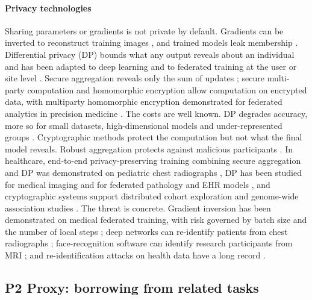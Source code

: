 \documentclass[acmsmall,screen,review]{acmart}
\theoremstyle{acmdefinition}
\begin{document}
\paragraph{Privacy technologies} Sharing parameters or gradients is not private by default. Gradients can be inverted to reconstruct training images \cite{geiping2020inverting,zhu2019deep}, and trained models leak membership \cite{carlini2022membership,shokri2017membership}. Differential privacy (DP) \cite{dwork2006calibrating,dwork2014algorithmic} bounds what any output reveals about an individual and has been adapted to deep learning \cite{abadi2016deep,mironov2017renyi} and to federated training at the user or site level \cite{mcmahan2018learning,wei2020federated}. Secure aggregation reveals only the sum of updates \cite{bonawitz2017practical}; secure multi-party computation \cite{evans2018pragmatic} and homomorphic encryption \cite{gentry2009fully} allow computation on encrypted data, with multiparty homomorphic encryption demonstrated for federated analytics in precision medicine \cite{froelicher2021truly}. The costs are well known. DP degrades accuracy, more so for small datasets, high-dimensional models and under-represented groups \cite{bagdasaryan2019differential,jayaraman2019evaluating,tramer2021differentially}. Cryptographic methods protect the computation but not what the final model reveals. Robust aggregation protects against malicious participants \cite{blanchard2017machine}. In healthcare, end-to-end privacy-preserving training combining secure aggregation and DP was demonstrated on pediatric chest radiographs \cite{kaissis2021end}, DP has been studied for medical imaging \cite{ziller2021medical} and for federated pathology \cite{adnan2022federated} and EHR models \cite{choudhury2019differential}, and cryptographic systems support distributed cohort exploration \cite{raisaro2019medco} and genome-wide association studies \cite{cho2018secure}. The threat is concrete. Gradient inversion has been demonstrated on medical federated training, with risk governed by batch size and the number of local steps \cite{hatamizadeh2023do}; deep networks can re-identify patients from chest radiographs \cite{packhauser2022deep}; face-recognition software can identify research participants from MRI \cite{schwarz2019identification}; and re-identification attacks on health data have a long record \cite{elemam2011systematic}.

\subsection{P2 Proxy: borrowing from related tasks}\label{sec:S6_2}
\end{document}
